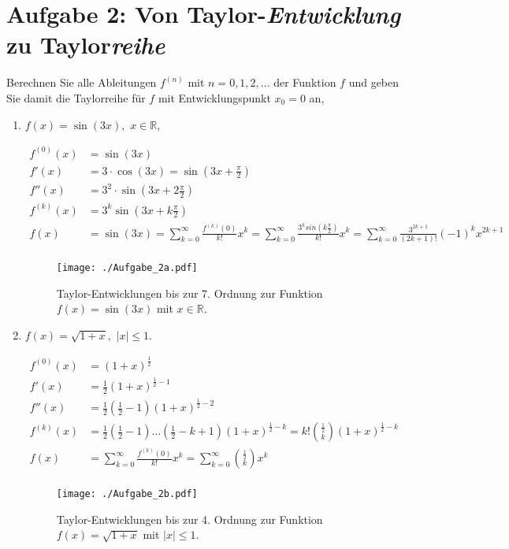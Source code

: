 \documentclass[11pt,a4paper, parskip=half ]{report}
\begin{document}
  \section*{Aufgabe 2: Von Taylor-\textit{Entwicklung} zu Taylor\textit{reihe}}
  Berechnen Sie alle Ableitungen $f^{(n)}$ mit $n = 0, 1, 2, ...$ der Funktion $f$ und geben Sie damit die Taylorreihe für $f$ mit Entwicklungspunkt $x_0 = 0$ an,  
  \begin{enumerate}
    \item $f(x) = \sin(3x), \,\, x \in \mathbb{R}$, 
    
    \vspace{20pt}
    \begin{align*}
    f^{(0)}(x) &= \sin(3x) \\
    f'(x) &= 3 \cdot \cos(3x) = \sin(3x + \frac{\pi}{2}) \\
    f''(x) &= 3^2 \cdot \sin(3x + 2 \frac{\pi}{2}) \\
    f^{(k)}(x) &= 3^k \sin(3x + k \frac{\pi}{2}) \\
    f(x) &= \sin(3x) = \sum_{k = 0}^{\infty} \frac{f^{(k)}(0)}{k!} x^k = \sum_{k = 0}^{\infty} \frac{3^k sin(k \frac{\pi}{2})}{k!} x^k = \sum_{k = 0}^{\infty} \frac{3^{2k+1}}{(2k+1)!} (-1)^k x^{2k+1} \\
    \end{align*}

    \begin{figure}
      \centering
      \texttt{[image: ./Aufgabe\_2a.pdf]}
      \caption{Taylor-Entwicklungen bis zur 7. Ordnung zur Funktion $f(x) = \sin(3x)$ mit $x \in \mathbb{R}$.}
      \label{fig:feynman2}
    \end{figure}

    \item $f(x) = \sqrt{1+x}, \,\,|x| \leq 1$.
    
    \vspace{20pt}
    \begin{align*}
    f^{(0)}(x) &= (1+x)^{\frac{1}{2}} \\
    f'(x) &= \frac{1}{2} (1+x)^{\frac{1}{2} -1} \\
    f''(x) &= \frac{1}{2} \left(\frac{1}{2} -1\right) (1+x)^{\frac{1}{2} -2} \\
    f^{(k)}(x) &= \frac{1}{2} \left(\frac{1}{2} -1\right) \dots \left(\frac{1}{2} - k + 1\right) (1+x)^{\frac{1}{2} - k} = k! {\frac{1}{2}\choose k} (1 + x)^{\frac{1}{2} - k}\\
    f(x) &= \sum_{k=0}^{\infty} \frac{f^{(k)}(0)}{k!} x^k = \sum_{k=0}^{\infty} {\frac{1}{2}\choose k} x^k \\
    \end{align*}

    \begin{figure}
      \centering
      \texttt{[image: ./Aufgabe\_2b.pdf]}
      \caption{Taylor-Entwicklungen bis zur 4. Ordnung zur Funktion $f(x) = \sqrt{1+x}$ mit $|x| \leq 1$.}
      \label{fig:feynman2}
    \end{figure}

  \end{enumerate}
\end{document}
